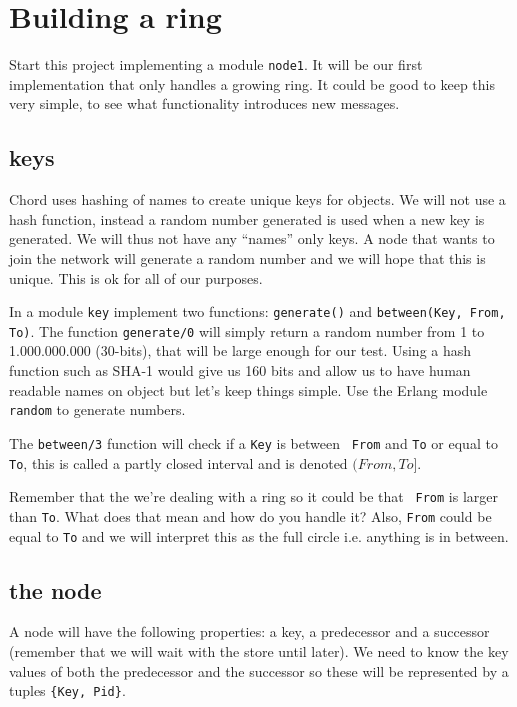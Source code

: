 \documentclass[a4paper,11pt]{article}
\begin{document}
\section{Building a ring}

Start this project implementing a module {\tt node1}. It will be our
first implementation that only handles a growing ring. It could be
good to keep this very simple, to see what functionality
introduces new messages.

\subsection{keys}

Chord uses hashing of names to create unique keys for objects. We will
not use a hash function, instead a random number generated is used
when a new key is generated. We will thus not have any ``names'' only
keys. A node that wants to join the network will generate a random
number and we will hope that this is unique. This is ok for all of our
purposes.

In a module {\tt key} implement two functions: {\tt generate()} and
{\tt between(Key, From, To)}. The function {\tt generate/0} will
simply return a random number from 1 to 1.000.000.000 (30-bits), that
will be large enough for our test. Using a hash function such as SHA-1
would give us 160 bits and allow us to have human readable names on
object but let's keep things simple. Use the Erlang module {\tt
  random} to generate numbers.

The {\tt between/3} function will check if a {\tt Key} is between {\tt
  From} and {\tt To} or equal to {\tt To}, this is called a partly 
closed interval and is denoted $(From, To]$. 

Remember that the we're dealing with a ring so it could be that {\tt
  From} is larger than {\tt To}. What does that mean and how do you
handle it? Also, {\tt From} could be equal to {\tt To} and we will
interpret this as the full circle i.e. anything is in between. 


\subsection{the node}

A node will have the following properties: a key, a predecessor and a
successor (remember that we will wait with the store until later). We
need to know the key values of both the predecessor and the successor
so these will be represented by a tuples {\tt \{Key, Pid\}}. 
\end{document}
